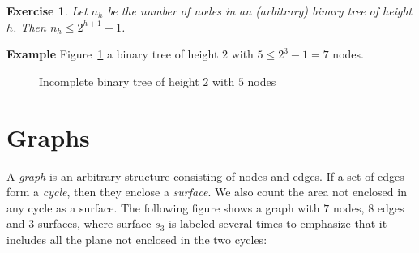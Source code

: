 \documentclass[11pt,a4paper]{report}
\newtheorem{exercise}{Exercise}
\begin{document}
\begin{exercise}
Let $n_h$ be the number of nodes in an (arbitrary) binary tree of height $h$. Then $n_h\leq 2^{h+1}-1$.
\end{exercise}

\textbf{Example} Figure~\ref{fig.incomplete} a binary tree of height $2$ with $5 \leq 2^3-1=7$ nodes.

\begin{figure}[t]
\begin{center}
\caption{Incomplete binary tree of height $2$ with $5$ nodes}\label{fig.incomplete}
\end{center}
\end{figure}

\section{Graphs}

A \emph{graph} is an arbitrary structure consisting of nodes and edges. If a set of edges form a \emph{cycle}, then they enclose a \emph{surface}. We also count the area not enclosed in any cycle as a surface. %
The following figure shows a graph with $7$ nodes, $8$ edges and $3$ surfaces, where surface $s_3$ is labeled several times to emphasize that it includes all the plane not enclosed in the two cycles:

\begin{center}
\end{center}
\end{document}
